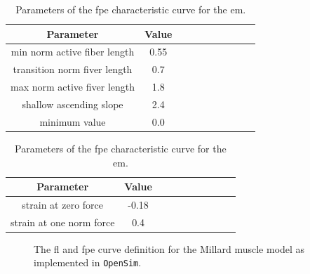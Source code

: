 \documentclass[11pt,a4paper,draft=false]{report}
\begin{document}
\begin{table}
  \centering
  \parbox{.45\linewidth}{
    \centering
    \caption{Parameters of the \gls{fl} characteristic curve for the
      \gls{em}.}\label{tab:eye-fl-curve}
    \begin{tabular}{@{}cccccccccc@{}}
      \toprule
      \textbf{Parameter} & \textbf{Value} \\
      \midrule
      min norm active fiber length & 0.55 \\
      transition norm fiver length & 0.7 \\
      max norm active fiver length & 1.8 \\
      shallow ascending slope &  2.4 \\
      minimum value & 0.0 \\
      \bottomrule
    \end{tabular}
  }
  \quad
  \parbox{.45\linewidth}{
    \vspace{-1.5cm}
    \centering
    \caption{Parameters of the \gls{fpe} characteristic curve for the
      \gls{em}.}\label{tab:eye-fpe-curve}
    \begin{tabular}{@{}cccccccccc@{}}
      \toprule
      \textbf{Parameter} & \textbf{Value} \\
      \midrule
      strain at zero force & -0.18 \\
      strain at one norm force & 0.4 \\
      \bottomrule
    \end{tabular}
  }
\end{table}

\begin{figure}[ht]
  \centering
  \caption{The \gls{fl} and \gls{fpe} curve definition for the Millard muscle
    model as implemented in \texttt{OpenSim}.}\label{fig:millard-curves}
\end{figure}
\end{document}
